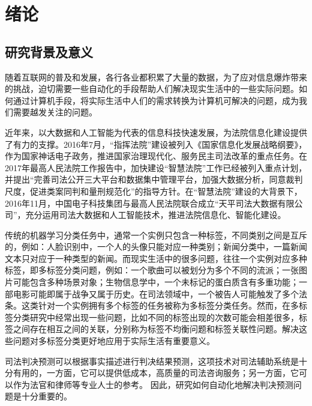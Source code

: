 
\chapter{绪论}
\section{研究背景及意义}
随着互联网的普及和发展，各行各业都积累了大量的数据，为了应对信息爆炸带来的挑战，迫切需要一些自动化的手段帮助人们解决现实生活中的一些实际问题。如何通过计算机手段，将实际生活中人们的需求转换为计算机可解决的问题，成为我们需要越发关注的问题。

近年来，以大数据和人工智能为代表的信息科技快速发展，为法院信息化建设提供了有力的支撑。2016年7月，“指挥法院”建设被列入《国家信息化发展战略纲要》，作为国家神话电子政务，推进国家治理现代化、服务民主司法改革的重点任务。在2017年最高人民法院工作报告中，加快建设“智慧法院”工作已经被列入重点计划，并提出“完善司法公开三大平台和数据集中管理平台，加强大数据分析，同意裁判尺度，促进类案同判和量刑规范化”的指导方针。在“智慧法院”建设的大背景下，2016年11月，中国电子科技集团与最高人民法院联合成立“天平司法大数据有限公司”，充分运用司法大数据和人工智能技术，推进法院信息化、智能化建设。

传统的机器学习分类任务中，通常一个实例只包含一种标签，不同类别之间是互斥的，例如：人脸识别中，一个人的头像只能对应一种类别；新闻分类中，一篇新闻文本只对应于一种类型的新闻。而现实生活中的很多问题，往往一个实例对应多种标签，即多标签分类问题，例如：一个歌曲可以被划分为多个不同的流派；一张图片可能包含多种场景对象；生物信息学中，一个未标记的蛋白质含有多重功能；一部电影可能即属于战争又属于历史。在司法领域中，一个被告人可能触发了多个法条。这类针对一个实例拥有多个标签的任务被称为多标签分类任务。然而，在多标签分类研究中经常出现一些问题，比如不同的标签出现的次数可能会相差很多，标签之间存在相互之间的关联，分别称为标签不均衡问题和标签关联性问题。解决这些问题对多标签分类更好地应用于实际生活有重要意义。

司法判决预测可以根据事实描述进行判决结果预测，这项技术对司法辅助系统是十分有用的，一方面，它可以提供低成本，高质量的司法咨询服务；另一方面，它可以作为法官和律师等专业人士的参考。 因此，研究如何自动化地解决判决预测问题是十分重要的。




